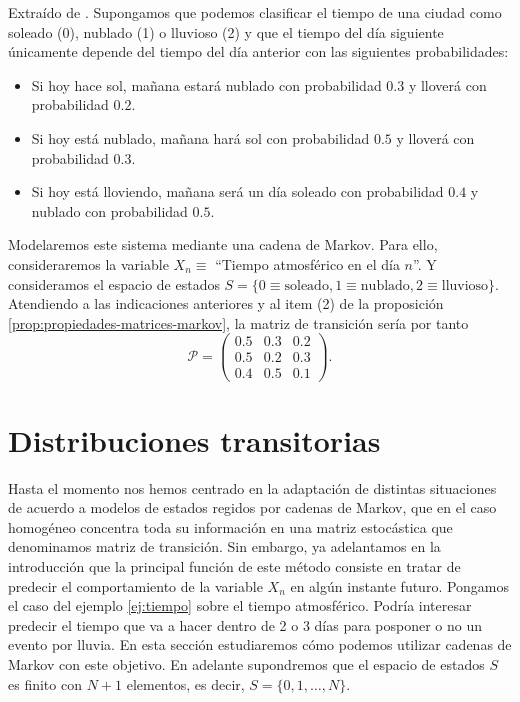 \begin{ejemplo}
    \label{ej:tiempo}
    Extraído de \cite[Ch. 2, Example 2.3]{kulkarni-2012}. Supongamos que podemos clasificar el tiempo de una ciudad como soleado (0), nublado (1) o lluvioso (2) y que el tiempo del día siguiente únicamente depende del tiempo del día anterior con las siguientes probabilidades:
    \begin{itemize}
        \item Si hoy hace sol, mañana estará nublado con probabilidad $0.3$ y lloverá con probabilidad $0.2$.
        \item Si hoy está nublado, mañana hará sol con probabilidad $0.5$ y lloverá con probabilidad $0.3$.
        \item Si hoy está lloviendo, mañana será un día soleado con probabilidad $0.4$ y nublado con probabilidad $0.5$.
    \end{itemize}

    Modelaremos este sistema mediante una cadena de Markov. Para ello, consideraremos la variable $X_n \equiv$ ``Tiempo atmosférico en el día $n$''. Y consideramos el espacio de estados $S = \{ 0\equiv\text{soleado}, 1\equiv\text{nublado}, 2\equiv\text{lluvioso}\}$. Atendiendo a las indicaciones anteriores y al item (2) de la proposición \ref{prop:propiedades-matrices-markov}, la matriz de transición sería por tanto
    $$ \mathcal P =\begin{pmatrix}
        0.5 & 0.3 & 0.2 \\
        0.5 & 0.2 & 0.3 \\
        0.4 & 0.5 & 0.1
    \end{pmatrix}.
    $$

\end{ejemplo}

\section{Distribuciones transitorias}

Hasta el momento nos hemos centrado en la adaptación de distintas situaciones de acuerdo a modelos de estados regidos por cadenas de Markov, que en el caso homogéneo concentra toda su información en una matriz estocástica que denominamos matriz de transición. Sin embargo, ya adelantamos en la introducción que la principal función de este método consiste en tratar de predecir el comportamiento de la variable $X_n$ en algún instante futuro. Pongamos el caso del ejemplo \ref{ej:tiempo} sobre el tiempo atmosférico. Podría interesar predecir el tiempo que va a hacer dentro de 2 o 3 días para posponer o no un evento por lluvia. En esta sección estudiaremos cómo podemos utilizar cadenas de Markov con este objetivo. En adelante supondremos que el espacio de estados $S$ es finito con $N+1$ elementos, es decir, $S=\{0,1,\dots,N\}$.

